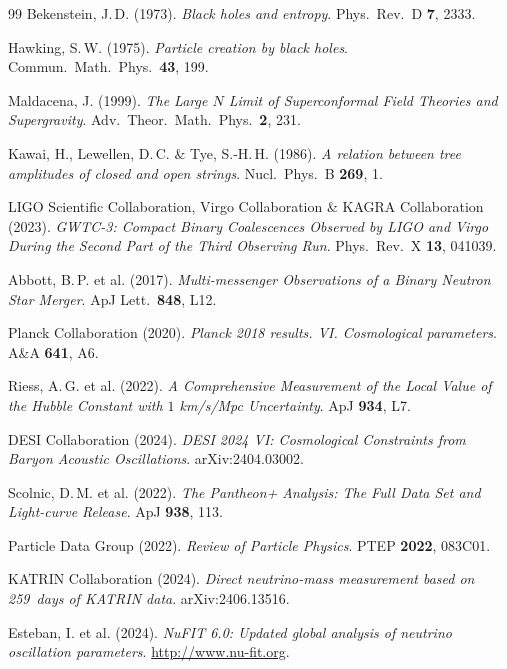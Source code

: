 \documentclass[12pt,a4paper,twoside]{article}
\begin{document}
\begin{thebibliography}{99}
Bekenstein, J.\,D. (1973).
\textit{Black holes and entropy}.
Phys.\ Rev.\ D \textbf{7}, 2333.

Hawking, S.\,W. (1975).
\textit{Particle creation by black holes}.
Commun.\ Math.\ Phys.\ \textbf{43}, 199.

Maldacena, J. (1999).
\textit{The Large $N$ Limit of Superconformal Field Theories and Supergravity}.
Adv.\ Theor.\ Math.\ Phys.\ \textbf{2}, 231.

Kawai, H., Lewellen, D.\,C. \& Tye, S.-H.\,H. (1986).
\textit{A relation between tree amplitudes of closed and open strings}.
Nucl.\ Phys.\ B \textbf{269}, 1.

LIGO Scientific Collaboration, Virgo Collaboration \& KAGRA Collaboration (2023).
\textit{GWTC-3: Compact Binary Coalescences Observed by LIGO and Virgo During the Second Part of the Third Observing Run}.
Phys.\ Rev.\ X \textbf{13}, 041039.

Abbott, B.\,P. et al. (2017).
\textit{Multi-messenger Observations of a Binary Neutron Star Merger}.
ApJ Lett.\ \textbf{848}, L12.

Planck Collaboration (2020).
\textit{Planck 2018 results. VI. Cosmological parameters}.
A\&A \textbf{641}, A6.

Riess, A.\,G. et al. (2022).
\textit{A Comprehensive Measurement of the Local Value of the Hubble Constant with $1$ km/s/Mpc Uncertainty}.
ApJ \textbf{934}, L7.

DESI Collaboration (2024).
\textit{DESI 2024 VI: Cosmological Constraints from Baryon Acoustic Oscillations}.
arXiv:2404.03002.

Scolnic, D.\,M. et al. (2022).
\textit{The Pantheon+ Analysis: The Full Data Set and Light-curve Release}.
ApJ \textbf{938}, 113.

Particle Data Group (2022).
\textit{Review of Particle Physics}.
PTEP \textbf{2022}, 083C01.

KATRIN Collaboration (2024).
\textit{Direct neutrino-mass measurement based on 259~days of KATRIN data}.
arXiv:2406.13516.

Esteban, I. et al. (2024).
\textit{NuFIT 6.0: Updated global analysis of neutrino oscillation parameters}.
\url{http://www.nu-fit.org}.


\end{thebibliography}
\end{document}
